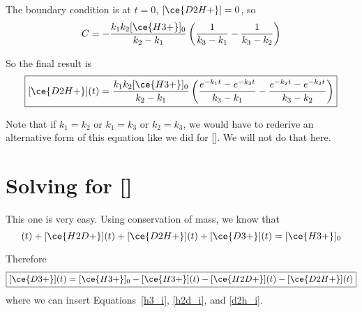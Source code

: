 \documentclass[10pt]{article}
\begin{document}
The boundary condition is at $t=0$, $[\ce{D2H+}]=0$, so
\begin{equation}
 C = -\frac{k_1k_2[\ce{H3+}]_0}{k_2 - k_1}\left(\frac{1}{k_3-k_1} - \frac{1}{k_3-k_2}\right)
\end{equation}

So the final result is
\begin{equation}
 \boxed{[\ce{D2H+}](t) = \frac{k_1k_2[\ce{H3+}]_0}{k_2 - k_1}\left(\frac{e^{-k_1 t} - e^{-k_3 t}}{k_3 - k_1} - \frac{e^{-k_2 t} - e^{-k_3 t}}{k_3 - k_2}\right) \label{d2h_i}}
\end{equation}

Note that if $k_1 = k_2$ or $k_1 = k_3$ or $k_2 = k_3$, we would have to rederive an alternative form of this equation like we did for [].
We will not do that here.

\section*{Solving for []}

This one is very easy.
Using conservation of mass, we know that
\begin{equation}
 [\ce{H3+}](t) + [\ce{H2D+}](t) + [\ce{D2H+}](t) + [\ce{D3+}](t) = [\ce{H3+}]_0
\end{equation}

Therefore
\begin{equation}
 \boxed{[\ce{D3+}](t) = [\ce{H3+}]_0 - [\ce{H3+}](t) - [\ce{H2D+}](t) - [\ce{D2H+}](t)}
\end{equation}
where we can insert Equations~\eqref{h3_i}, \eqref{h2d_i}, and \eqref{d2h_i}.







 
\end{document}
